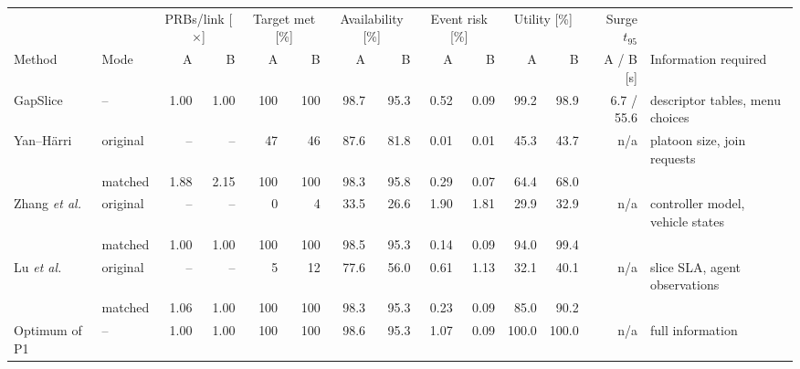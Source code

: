 \begin{tabular}{@{}l l r r r r r r r r r r r l@{}}
\toprule
 & & \multicolumn{2}{c}{PRBs/link [$\times$]} & \multicolumn{2}{c}{Target met [\%]} & \multicolumn{2}{c}{Availability [\%]} & \multicolumn{2}{c}{Event risk [\%]} & \multicolumn{2}{c}{Utility [\%]} & Surge $t_{95}$ & \\
\cmidrule(lr){3-4}\cmidrule(lr){5-6}\cmidrule(lr){7-8}\cmidrule(lr){9-10}\cmidrule(lr){11-12}
Method & Mode & A & B & A & B & A & B & A & B & A & B & A / B [s] & Information required\\
\midrule
GapSlice & -- & 1.00 & 1.00 & 100 & 100 & 98.7 & 95.3 & 0.52 & 0.09 & 99.2 & 98.9 & 6.7 / 55.6 & descriptor tables, menu choices\\
\addlinespace[2pt]
Yan--H\"arri~\cite{Yan2024ICC} & original & -- & -- & 47 & 46 & 87.6 & 81.8 & 0.01 & 0.01 & 45.3 & 43.7 & n/a & platoon size, join requests\\
 & matched & 1.88 & 2.15 & 100 & 100 & 98.3 & 95.8 & 0.29 & 0.07 & 64.4 & 68.0 &  & \\
\addlinespace[2pt]
Zhang \emph{et al.}~\cite{Zhang2023TIV} & original & -- & -- & 0 & 4 & 33.5 & 26.6 & 1.90 & 1.81 & 29.9 & 32.9 & n/a & controller model, vehicle states\\
 & matched & 1.00 & 1.00 & 100 & 100 & 98.5 & 95.3 & 0.14 & 0.09 & 94.0 & 99.4 &  & \\
\addlinespace[2pt]
Lu \emph{et al.}~\cite{Lu2024TNSM} & original & -- & -- & 5 & 12 & 77.6 & 56.0 & 0.61 & 1.13 & 32.1 & 40.1 & n/a & slice SLA, agent observations\\
 & matched & 1.06 & 1.00 & 100 & 100 & 98.3 & 95.3 & 0.23 & 0.09 & 85.0 & 90.2 &  & \\
\addlinespace[2pt]
Optimum of P1 & -- & 1.00 & 1.00 & 100 & 100 & 98.6 & 95.3 & 1.07 & 0.09 & 100.0 & 100.0 & n/a & full information\\
\bottomrule
\end{tabular}
